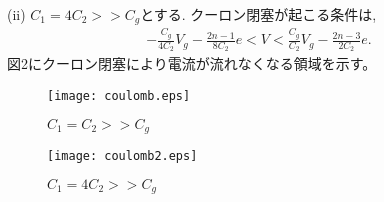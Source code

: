 \documentclass[11pt,a4paper]{jsarticle}
\begin{document}
(ii) $C_1=4C_2>>C_g$とする. クーロン閉塞が起こる条件は,
\begin{eqnarray}
-\frac{C_g}{4C_2}V_g -\frac{2n-1}{8C_2}e< V <  \frac{C_g}{C_2}V_g -\frac{2n-3}{2C_2}e.
\end{eqnarray}
図2にクーロン閉塞により電流が流れなくなる領域を示す。

\begin{figure}[htb]
    \begin{center}
   \texttt{[image: coulomb.eps]}
  \end{center}
  \caption{$C_1=C_2>>C_g$}
\end{figure}

\begin{figure}[htb]
    \begin{center}
   \texttt{[image: coulomb2.eps]}
  \end{center}
  \caption{$C_1=4C_2>>C_g$}
\end{figure}
\end{document}
